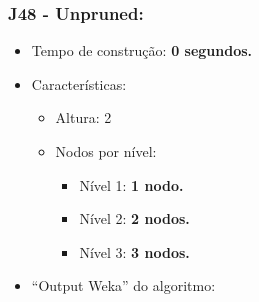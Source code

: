 \documentclass[
    article,            %
    11pt,               %
    oneside,            %
    a4paper,            %
    english,            %
    brazil,             %
    sumario=tradicional,
    ]{abntex2}
\begin{document}
\subsubsection*{\textbf{J48 - Unpruned:}}
    \begin{itemize}
        \item Tempo de construção: \textbf{0 segundos.}
        \item Características:
        \begin{itemize}
            \item Altura: 2
            \item Nodos por nível:
                \begin{itemize}
                    \item Nível 1: \textbf{1 nodo.}
                    \item Nível 2: \textbf{2 nodos.}
                    \item Nível 3: \textbf{3 nodos.}
                \end{itemize}
        \end{itemize}
        \item ``Output Weka'' do algoritmo:
    \end{itemize}   
\end{document}
